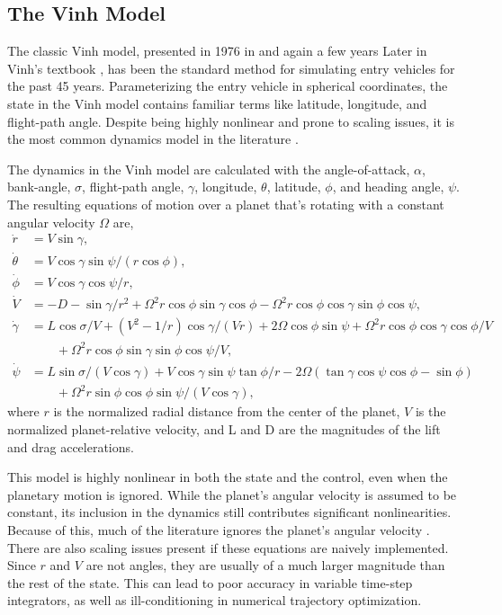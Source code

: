 \subsection{The Vinh Model}
The classic Vinh model, presented in 1976 in \cite{busemann1976} and again a few years Later in Vinh's textbook \cite{vinh1980}, has been the standard method for simulating entry vehicles for the past 45 years. Parameterizing the entry vehicle in spherical coordinates, the state in the Vinh model contains familiar terms like latitude, longitude, and flight-path angle. Despite being highly nonlinear and prone to scaling issues, it is the most common dynamics model in the literature \cite{busemann1976,vinh1980,vinh2000,wang2018,wang2019a,lu2014,gallais2007}.

The dynamics in the Vinh model are calculated with the angle-of-attack, $\alpha$, bank-angle, $\sigma$, flight-path angle, $\gamma$, longitude, $\theta$, latitude, $\phi$, and heading angle, $\psi$. The resulting equations of motion over a planet that's rotating with a constant angular velocity $\Omega$ are,
\begin{align}
\dot{r}&=V \sin \gamma ,\label{eq:vin1}\\
\dot{\theta}&=V \cos \gamma \sin \psi /(r \cos \phi) ,\\
\dot{\phi}&=V \cos \gamma \cos \psi / r ,\\
\dot{V}&=-D-\sin \gamma / r^{2} +\Omega^{2} r \cos \phi\sin \gamma \cos \phi   -\Omega^{2} r \cos \phi \cos \gamma \sin \phi \cos \psi  ,\\
\dot{\gamma}&=L \cos \sigma / V+\left(V^{2}-1 / r\right) \cos \gamma /(V r) +2 \Omega \cos \phi \sin \psi +\Omega^{2} r \cos \phi\cos \gamma \cos \phi / V   
 \\ & \quad \quad + \Omega^{2} r \cos \phi\sin \gamma \sin \phi \cos \psi / V , \\
\dot{\psi}&=L \sin \sigma /(V \cos \gamma)+V \cos \gamma \sin \psi \tan \phi / r 
 -2 \Omega(\tan \gamma \cos \psi \cos \phi-\sin \phi) \\ 
  & \quad \quad +\Omega^{2} r \sin \phi \cos \phi \sin \psi /(V \cos \gamma) , \label{eq:vin6}
\end{align}
where $r$ is the normalized radial distance from the center of the planet, $V$ is the normalized planet-relative velocity, and L and D are the magnitudes of the lift and drag accelerations. 

This model is highly nonlinear in both the state and the control, even when the planetary motion is ignored. While the planet's angular velocity is assumed to be constant, its inclusion in the dynamics still contributes significant nonlinearities. Because of this, much of the literature ignores the planet's angular velocity \cite{wang2016}. There are also scaling issues present if these equations are naively implemented. Since $r$ and $V$ are not angles, they are usually of a much larger magnitude than the rest of the state. This can lead to poor accuracy in variable time-step integrators, as well as ill-conditioning in numerical trajectory optimization.

